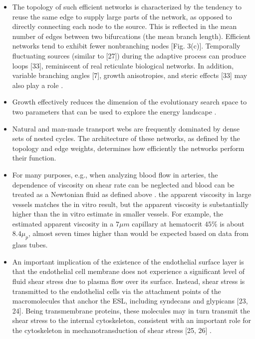 \begin{itemize}
	\item The topology of such efficient networks is characterized by the tendency to reuse the same edge to supply large parts of the network, as opposed to directly connecting each node to the source. This is reflected in the mean number of edges between two bifurcations (the mean branch length). Efficient networks tend to exhibit fewer nonbranching nodes [Fig. 3(c)]. Temporally fluctuating sources (similar to [27]) during the adaptive process can produce loops [33], reminiscent of real reticulate biological networks. In addition, variable branching angles [7], growth anisotropies, and steric effects [33] may also play a role \cite{Ronellenfitsch2016}.
	\item Growth effectively reduces the dimension of the evolutionary search space to two parameters that can be used to explore the energy landscape \cite{Ronellenfitsch2016}.
	\item Natural and man-made transport webs are frequently dominated by dense sets of nested cycles. The architecture of these networks, as defined by the topology and edge weights, determines how efficiently the networks perform their function. \cite{Modes2016}
	\item For many purposes, e.g., when analyzing blood flow in arteries, the dependence of viscosity on shear rate can be neglected and blood can be treated as a Newtonian fluid as defined above \cite{Secomb2021}.
	 the apparent viscosity in large vessels matches the in vitro result, but the apparent viscosity is substantially higher than the in vitro estimate in smaller vessels. For example, the estimated apparent viscosity in a $7\mu m$ capillary at hematocrit $45\%$ is about $8.4\mu_p$, almost seven times higher than would be expected based on data from glass tubes.
	 \item An important implication of the existence of the endothelial surface layer is that the endothelial cell membrane does not experience a significant level of fluid shear stress due to plasma flow over its surface. Instead, shear stress is transmitted to the endothelial cells via the attachment points of the macromolecules that anchor the ESL, including syndecans and glypicans [23, 24]. Being transmembrane proteins, these molecules may in turn transmit the shear stress to the internal cytoskeleton, consistent with an important role for the cytoskeleton in mechanotransduction of shear stress [25, 26] \cite{Secomb2021}.

\end{itemize}
